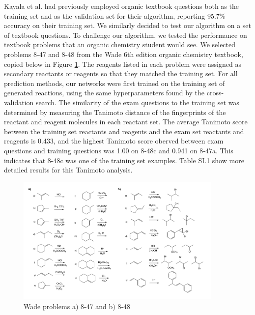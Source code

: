 Kayala et al.\cite{Kayala_2012} had previously employed organic textbook questions both as the training set and as the validation set for their algorithm, reporting 95.7\% accuracy on their training set. We similarly decided to test our algorithm on a set of textbook questions. To challenge our algorithm, we tested the performance on textbook problems that an organic chemistry student would see. We selected problems 8-47 and 8-48 from the Wade 6th edition organic chemistry textbook, copied below in Figure \ref{fig:Wade_problems_copy}.\cite{wade2013organic} The reagents listed in each problem were assigned as secondary reactants or reagents so that they matched the training set. For all prediction methods, our networks were first trained on the training set of generated reactions, using the same hyperparameters found by the cross-validation search. The similarity of the exam questions to the training set was determined by measuring the Tanimoto\cite{Bajusz_2015} distance of the fingerprints of the reactant and reagent molecules in each reactant set. The average Tanimoto score between the training set reactants and reagents and the exam set reactants and reagents is 0.433, and the highest Tanimoto score oberved between exam questions and training questions was 1.00 on 8-48c and 0.941 on 8-47a. This indicates that 8-48c was one of the training set examples. Table SI.1  show more detailed results for this Tanimoto analysis.

\begin{figure}
\begin{center}
\includegraphics[width=0.9\textwidth]{Wade_problems}
\caption[Organic Chemistry Test Problems]{\label{fig:Wade_problems_copy} Wade problems a) 8-47 and b) 8-48}
\end{center}
\end{figure}

